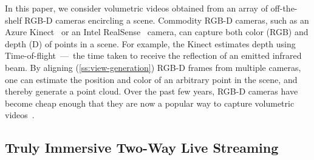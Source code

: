 In this paper, we consider volumetric videos obtained from an array of off-the-shelf RGB-D cameras encircling a scene. %
%
Commodity RGB-D cameras, such as an Azure Kinect~\cite{cite:kinect} or an Intel RealSense~\cite{cite:realsense} camera, can capture both color (RGB) and depth (D) of points in a scene.
%
For example, the Kinect estimates depth using Time-of-flight~---~the time taken to receive the reflection of an emitted infrared beam.
%
By aligning (\cref{ss:view-generation}) RGB-D frames from multiple cameras, one can estimate the position and color of an arbitrary point in the scene, and thereby generate a point cloud.
%
Over the past few years, RGB-D cameras have become cheap enough that they are now a popular way to capture volumetric videos~\cite{xxx}.




\subsection{Truly Immersive Two-Way Live Streaming}
\label{s:immersive-two-way}

